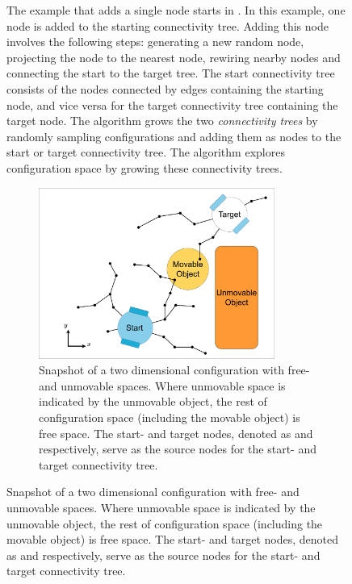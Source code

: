 \begin{figure}[H]
\begin{minipage}{0.47\linewidth}
The example that adds a single node starts in . In this example, one node is added to the starting connectivity tree. Adding this node involves the following steps: generating a new random node, projecting the node to the nearest node, rewiring nearby nodes and connecting the start to the target tree. The start connectivity tree consists of the nodes connected by edges containing the starting node, and vice versa for the target connectivity tree containing the target node. The algorithm grows the two \textit{connectivity trees} by randomly sampling configurations and adding them as nodes to the start or target connectivity tree. The algorithm explores configuration space by growing these connectivity trees.\bs
\end{minipage}
\hfill
\begin{minipage}{0.5\linewidth}
\begin{figure}[H]
    \centering
    \includegraphics[width=0.85\textwidth, cfbox=my_grey 5pt 0pt]{figures/required_background/mp/1mp_init.drawio.png}
    \caption{Snapshot of a two dimensional configuration with free- and unmovable spaces. Where unmovable space is indicated by the unmovable object, the rest of configuration space (including the movable object) is free space. The start- and target nodes, denoted as  and  respectively, serve as the source nodes for the start- and target connectivity tree.}
    \label{fig:motion_planner_adding_one_node_all}
\end{figure}
\end{minipage}
\end{figure}


